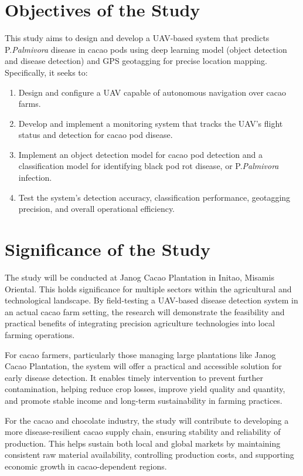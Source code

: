{\section{Objectives of the Study}

This study aims to design and develop a UAV-based system that predicts P.\textit{Palmivora} disease in cacao pods using deep learning model (object detection and disease detection) and GPS geotagging for precise location mapping. Specifically, it seeks to:

\begin{enumerate}
	\item Design and configure a UAV capable of autonomous navigation over cacao farms.
	\item Develop and implement a monitoring system that tracks the UAV’s flight status and detection for cacao pod disease.
	\item Implement an object detection model for cacao pod detection and a classification model for identifying black pod rot disease, or P.\textit{Palmivora} infection.
	\item Test the system’s detection accuracy, classification performance, geotagging precision, and overall operational efficiency.
\end{enumerate}

\section{Significance of the Study}
The study will be conducted at Janog Cacao Plantation in Initao, Misamis Oriental. This holds significance for multiple sectors within the agricultural and technological landscape. By field-testing a UAV-based disease detection system in an actual cacao farm setting, the research will demonstrate the feasibility and practical benefits of integrating precision agriculture technologies into local farming operations.

For cacao farmers, particularly those managing large plantations like Janog Cacao Plantation, the system will offer a practical and accessible solution for early disease detection. It enables timely intervention to prevent further contamination, helping reduce crop losses, improve yield quality and quantity, and promote stable income and long-term sustainability in farming practices.

For the cacao and chocolate industry, the study will contribute to developing a more disease-resilient cacao supply chain, ensuring stability and reliability of production. This helps sustain both local and global markets by maintaining consistent raw material availability, controlling production costs, and supporting economic growth in cacao-dependent regions.

}
